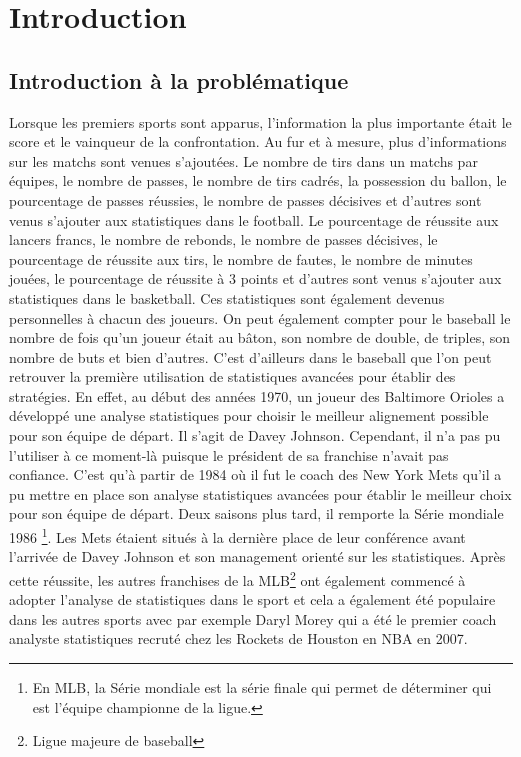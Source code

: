 \documentclass[12pt]{article}
\begin{document}
\section{Introduction}

\subsection{Introduction à la problématique}
Lorsque les premiers sports sont apparus, l'information la plus importante était le score et le vainqueur de la confrontation.
Au fur et à mesure, plus d'informations sur les matchs sont venues s'ajoutées.
Le nombre de tirs dans un matchs par équipes, le nombre de passes, le nombre de tirs cadrés, la possession du ballon, le pourcentage de passes réussies, le nombre de passes décisives et d'autres sont venus s'ajouter aux statistiques dans le football.
Le pourcentage de réussite aux lancers francs, le nombre de rebonds, le nombre de passes décisives, le pourcentage de réussite aux tirs, le nombre de fautes, le nombre de minutes jouées, le pourcentage de réussite à 3 points et d'autres sont venus s'ajouter aux statistiques dans le basketball.
Ces statistiques sont également devenus personnelles à chacun des joueurs.
On peut également compter pour le baseball le nombre de fois qu'un joueur était au bâton, son nombre de double, de triples, son nombre de buts et bien d'autres.
\newline\newline
C'est d'ailleurs dans le baseball que l'on peut retrouver la première utilisation de statistiques avancées pour établir des stratégies.
En effet, au début des années 1970, un joueur des Baltimore Orioles a développé une analyse statistiques pour choisir le meilleur alignement possible pour son équipe de départ.
Il s'agit de Davey Johnson.
Cependant, il n'a pas pu l'utiliser à ce moment-là puisque le président de sa franchise n'avait pas confiance. C'est qu'à partir de 1984 où il fut le coach des New York Mets qu'il a pu mettre en place son analyse statistiques avancées pour établir le meilleur choix pour son équipe de départ. \cite{incPCMag1984}
Deux saisons plus tard, il remporte la Série mondiale 1986 \footnote{En MLB, la Série mondiale est la série finale qui permet de déterminer qui est l'équipe championne de la ligue.}. Les Mets étaient situés à la dernière place de leur conférence avant l'arrivée de Davey Johnson et son management orienté sur les statistiques.
\newline
Après cette réussite, les autres franchises de la MLB\footnote{Ligue majeure de baseball} ont également commencé à adopter l'analyse de statistiques dans le sport et cela a également été populaire dans les autres sports avec par exemple Daryl Morey qui a été le premier coach analyste statistiques recruté chez les Rockets de Houston en NBA en 2007. \cite{DarylMorey13year2020}
\end{document}
